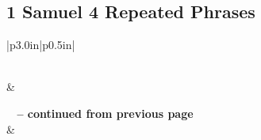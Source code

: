 \subsection{1 Samuel 4 Repeated Phrases}


\normalsize
 
\begin{center}
\begin{longtable}{|p{3.0in}|p{0.5in}|}
\caption[1 Samuel 4 Repeated Phrases]{1 Samuel 4 Repeated Phrases}\label{table:Repeated Phrases 1 Samuel 4} \\
\hline {} &  \\ \hline 
\endfirsthead
 
{{\bfseries \tablename\ \thetable{} -- continued from previous page}} \\  
\hline {} &  \\ \hline 
\endhead
 

\end{longtable}
\end{center}
